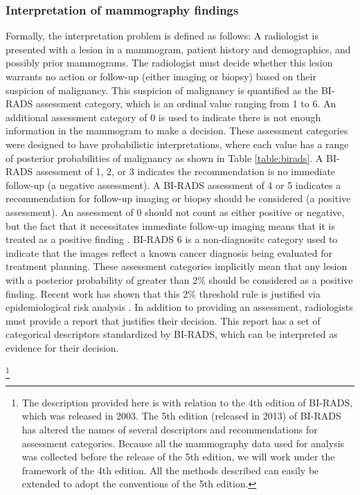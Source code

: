 \subsubsection{Interpretation of mammography findings}
Formally, the interpretation problem is defined as follows: A radiologist is presented with a lesion in a mammogram, patient history and demographics, and possibly prior mammograms. The radiologist must decide whether this lesion warrants no action or follow-up (either imaging or biopsy) based on their suspicion of malignancy. This suspicion of malignancy is quantified as the BI-RADS assessment category, which is an ordinal value ranging from 1 to 6. An additional assessment category of 0 is used to indicate there is not enough information in the mammogram to make a decision. These assessment categories were designed to have probabilistic interpretations, where each value has a range of posterior probabilities of malignancy as shown in Table \ref{table:birads}. A BI-RADS assessment of 1, 2, or 3 indicates the recommendation is no immediate follow-up (a negative assessment). A BI-RADS assessment of 4 or 5 indicates a recommendation for follow-up imaging or biopsy should be considered (a positive assessment). An assessment of 0 should not count as either positive or negative, but the fact that it necessitates immediate follow-up imaging means that it is treated as a positive finding \cite{Barlow:2004cy}. BI-RADS 6 is a non-diagnositc category used to indicate that the images reflect a known cancer diagnosis being evaluated for treatment planning. These assessment categories implicitly mean that any lesion with a posterior probability of greater than 2\% should be considered as a positive finding. Recent work has shown that this 2\% threshold rule is justified via epidemiological risk analysis \cite{Burnside:2012fk}. In addition to providing an assessment, radiologists must provide a report that justifies their decision. This report has a set of categorical descriptors standardized by BI-RADS, which can be interpreted as evidence for their decision.

\footnote{The description provided here is with relation to the 4th edition of BI-RADS, which was released in 2003. The 5th edition (released in 2013) of BI-RADS has altered the names of several descriptors and recommendations for assessment categories. Because all the mammography data used for analysis was collected before the release of the 5th edition, we will work under the framework of the 4th edition. All the methods described can easily be extended to adopt the conventions of the 5th edition.}

